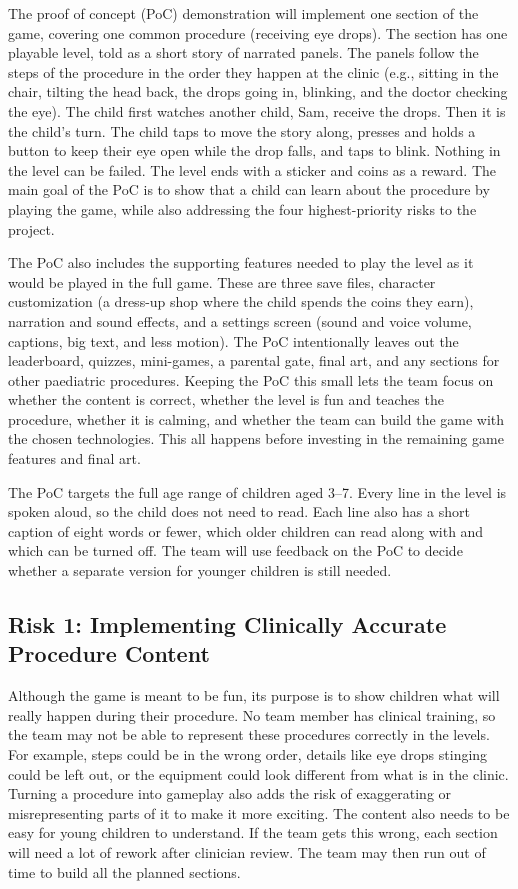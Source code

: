 \documentclass{article}
\begin{document}
\noindent The proof of concept (PoC) demonstration will implement one section of
the game, covering one common procedure (receiving eye drops). The section has
one playable level, told as a short story of narrated panels. The panels follow
the steps of the procedure in the order they happen at the clinic (e.g.,
sitting in the chair, tilting the head back, the drops going in, blinking, and
the doctor checking the eye). The child first watches another child, Sam,
receive the drops. Then it is the child's turn. The child taps to move the story
along, presses and holds a button to keep their eye open while the drop falls,
and taps to blink. Nothing in the level can be failed. The level ends with a
sticker and coins as a reward. The main goal of the PoC is to show that a child
can learn about the procedure by playing the game, while also addressing the
four highest-priority risks to the project.

\noindent The PoC also includes the supporting features needed to play the
level as it would be played in the full game. These are three save files,
character customization (a dress-up shop where the child spends the coins they
earn), narration and sound effects, and a settings screen (sound and voice
volume, captions, big text, and less motion). The PoC intentionally leaves out
the leaderboard, quizzes, mini-games, a parental gate, final art, and any
sections for other paediatric procedures. Keeping the PoC this small lets the
team focus on whether the content is correct, whether the level is fun and
teaches the procedure, whether it is calming, and whether the team can build the
game with the chosen technologies. This all happens before investing in the
remaining game features and final art.

\noindent The PoC targets the full age range of children aged 3--7. Every line
in the level is spoken aloud, so the child does not need to read. Each line
also has a short caption of eight words or fewer, which older children can read
along with and which can be turned off. The team will use feedback on the PoC
to decide whether a separate version for younger children is still needed.

\subsection{Risk 1: Implementing Clinically Accurate Procedure Content}

Although the game is meant to be fun, its purpose is to show children what will
really happen during their procedure. No team member has clinical training, so
the team may not be able to represent these procedures correctly in the levels.
For example, steps could be in the wrong order, details like eye drops stinging
could be left out, or the equipment could look different from what is in the
clinic. Turning a procedure into gameplay also adds the risk of exaggerating or
misrepresenting parts of it to make it more exciting. The content also needs to
be easy for young children to understand. If the team gets this wrong, each
section will need a lot of rework after clinician review. The team may then run
out of time to build all the planned sections.
\end{document}
